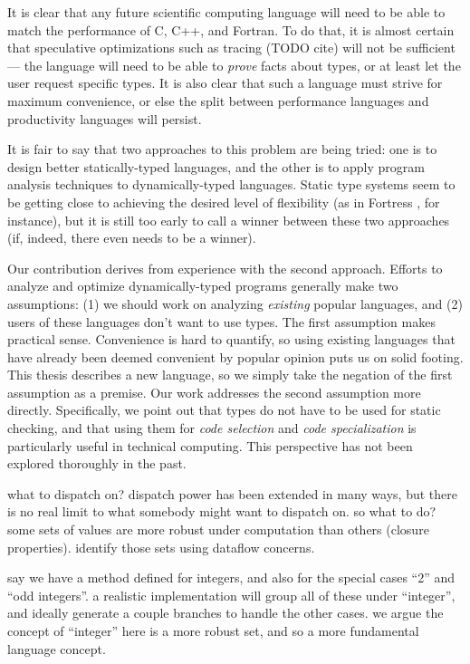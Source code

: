 It is clear that any future scientific computing language will need to be able to
match the performance of C, C++, and Fortran. To do that, it is almost certain
that speculative optimizations such as tracing (TODO cite) will not be sufficient ---
the language will need to be able to \emph{prove} facts about types, or at least
let the user request specific types. It is also clear that such a language must
strive for maximum convenience, or else the split between performance languages
and productivity languages will persist.

It is fair to say that two approaches to this problem are being tried: one is
to design better statically-typed languages, and the other is to apply
program analysis techniques to dynamically-typed languages.
Static type systems seem to be getting close to achieving the desired level
of flexibility (as in Fortress \cite{fortresspec}, for instance), but it
is still too early to call a winner between these two approaches
(if, indeed, there even needs to be a winner).

Our contribution derives from experience with the second approach.
Efforts to analyze and optimize dynamically-typed programs generally make two
assumptions: (1) we should work on analyzing \emph{existing} popular
languages, and (2) users of these languages don't want to use types.
The first assumption makes practical sense.
Convenience is hard to quantify, so using existing languages that have already
been deemed convenient by popular opinion puts us on solid footing.
This thesis describes a new language, so we simply take the negation of the
first assumption as a premise.
Our work addresses the second assumption more directly.
Specifically, we point out that types do not have to be used for
static checking, and that using them for \emph{code selection} and
\emph{code specialization} is particularly useful in technical computing.
This perspective has not been explored thoroughly in the past.



what to dispatch on? dispatch power has been extended in many ways, but
there is no real limit to what somebody might want to dispatch on.
so what to do?
some sets of values are more robust under computation than others
(closure properties).
identify those sets using dataflow concerns.

say we have a method defined for integers, and also for the special cases
``2'' and ``odd integers''. a realistic implementation
will group all of these under ``integer'', and ideally generate a couple
branches to handle the other cases. we argue the concept of ``integer''
here is a more robust set, and so a more fundamental language concept.


